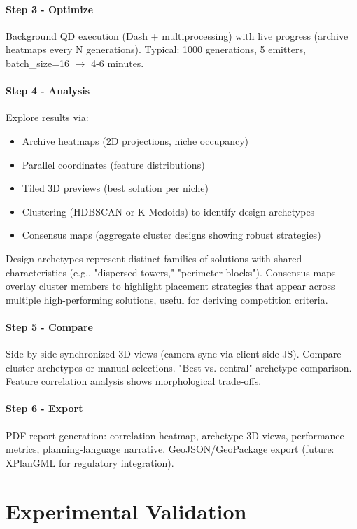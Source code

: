 \documentclass[times,final]{elsarticle}
\begin{document}
\paragraph{Step 3 - Optimize}
Background QD execution (Dash + multiprocessing) with live progress (archive heatmaps every N generations). Typical: 1000 generations, 5 emitters, batch\_size=16 $\rightarrow$ 4-6 minutes.

\paragraph{Step 4 - Analysis}
Explore results via:
\begin{itemize}
\item Archive heatmaps (2D projections, niche occupancy)
\item Parallel coordinates (feature distributions)
\item Tiled 3D previews (best solution per niche)
\item Clustering (HDBSCAN or K-Medoids) to identify design archetypes
\item Consensus maps (aggregate cluster designs showing robust strategies)
\end{itemize}

Design archetypes represent distinct families of solutions with shared characteristics (e.g., "dispersed towers," "perimeter blocks"). Consensus maps overlay cluster members to highlight placement strategies that appear across multiple high-performing solutions, useful for deriving competition criteria.

\paragraph{Step 5 - Compare}
Side-by-side synchronized 3D views (camera sync via client-side JS). Compare cluster archetypes or manual selections. "Best vs. central" archetype comparison. Feature correlation analysis shows morphological trade-offs.

\paragraph{Step 6 - Export}
PDF report generation: correlation heatmap, archetype 3D views, performance metrics, planning-language narrative. GeoJSON/GeoPackage export (future: XPlanGML for regulatory integration).

\section{Experimental Validation}
\end{document}
